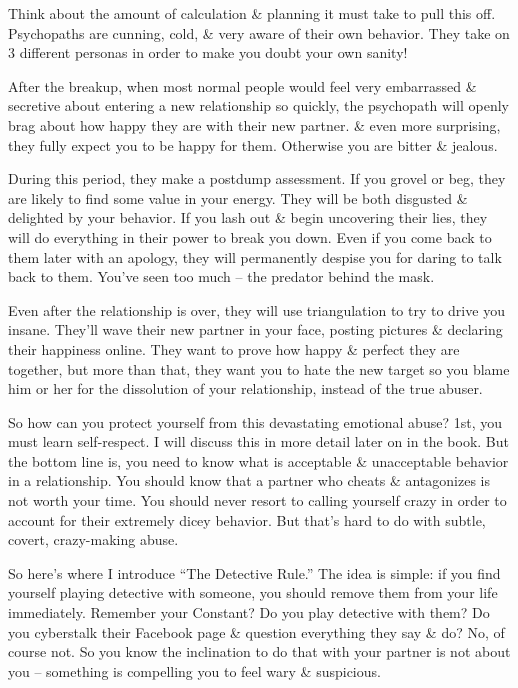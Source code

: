 \documentclass{article}
\numberwithin{equation}{section}
\begin{document}
Think about the amount of calculation \& planning it must take to pull this off. Psychopaths are cunning, cold, \& very aware of their own behavior. They take on 3 different personas in order to make you doubt your own sanity!

After the breakup, when most normal people would feel very embarrassed \& secretive about entering a new relationship so quickly, the psychopath will openly brag about how happy they are with their new partner. \& even more surprising, they fully expect you to be happy for them. Otherwise you are bitter \& jealous.

During this period, they make a postdump assessment. If you grovel or beg, they are likely to find some value in your energy. They will be both disgusted \& delighted by your behavior. If you lash out \& begin uncovering their lies, they will do everything in their power to break you down. Even if you come back to them later with an apology, they will permanently despise you for daring to talk back to them. You've seen too much -- the predator behind the mask.

Even after the relationship is over, they will use triangulation to try to drive you insane. They'll wave their new partner in your face, posting pictures \& declaring their happiness online. They want to prove how happy \& perfect they are together, but more than that, they want you to hate the new target so you blame him or her for the dissolution of your relationship, instead of the true abuser.

So how can you protect yourself from this devastating emotional abuse? 1st, you must learn self-respect. I will discuss this in more detail later on in the book. But the bottom line is, you need to know what is acceptable \& unacceptable behavior in a relationship. You should know that a partner who cheats \& antagonizes is not worth your time. You should never resort to calling yourself crazy in order to account for their extremely dicey behavior. But that's hard to do with subtle, covert, crazy-making abuse.

So here's where I introduce ``The Detective Rule.'' The idea is simple: if you find yourself playing detective with someone, you should remove them from your life immediately. Remember your Constant? Do you play detective with them? Do you cyberstalk their Facebook page \& question everything they say \& do? No, of course not. So you know the inclination to do that with your partner is not about you -- something is compelling you to feel wary \& suspicious.
\end{document}
